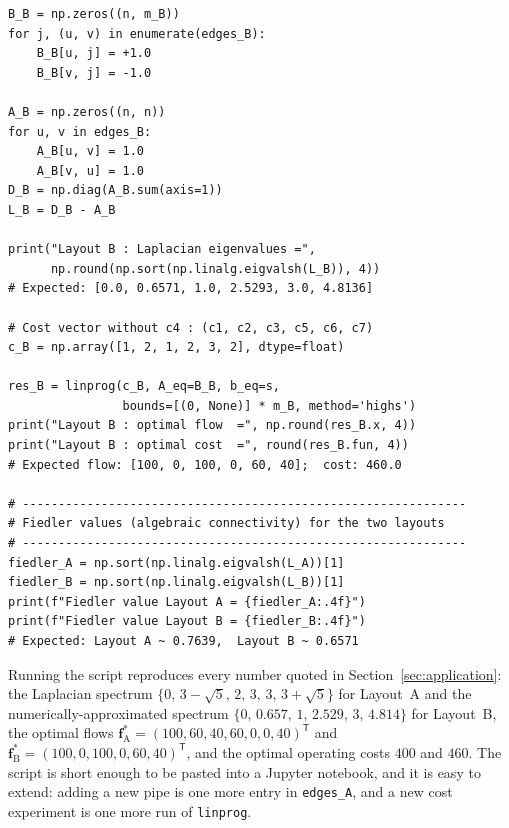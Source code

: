\documentclass[11pt,a4paper]{article}
\newcommand{\vect}[1]{\mathbf{#1}}
\newcommand{\transpose}{^{\mathsf{T}}}
\begin{document}
\begin{verbatim}
B_B = np.zeros((n, m_B))
for j, (u, v) in enumerate(edges_B):
    B_B[u, j] = +1.0
    B_B[v, j] = -1.0

A_B = np.zeros((n, n))
for u, v in edges_B:
    A_B[u, v] = 1.0
    A_B[v, u] = 1.0
D_B = np.diag(A_B.sum(axis=1))
L_B = D_B - A_B

print("Layout B : Laplacian eigenvalues =",
      np.round(np.sort(np.linalg.eigvalsh(L_B)), 4))
# Expected: [0.0, 0.6571, 1.0, 2.5293, 3.0, 4.8136]

# Cost vector without c4 : (c1, c2, c3, c5, c6, c7)
c_B = np.array([1, 2, 1, 2, 3, 2], dtype=float)

res_B = linprog(c_B, A_eq=B_B, b_eq=s,
                bounds=[(0, None)] * m_B, method='highs')
print("Layout B : optimal flow  =", np.round(res_B.x, 4))
print("Layout B : optimal cost  =", round(res_B.fun, 4))
# Expected flow: [100, 0, 100, 0, 60, 40];  cost: 460.0

# --------------------------------------------------------------
# Fiedler values (algebraic connectivity) for the two layouts
# --------------------------------------------------------------
fiedler_A = np.sort(np.linalg.eigvalsh(L_A))[1]
fiedler_B = np.sort(np.linalg.eigvalsh(L_B))[1]
print(f"Fiedler value Layout A = {fiedler_A:.4f}")
print(f"Fiedler value Layout B = {fiedler_B:.4f}")
# Expected: Layout A ~ 0.7639,  Layout B ~ 0.6571
\end{verbatim}

Running the script reproduces every number quoted in
Section~\ref{sec:application}: the Laplacian spectrum
$\{0,\, 3-\sqrt{5},\, 2,\, 3,\, 3,\, 3+\sqrt{5}\}$ for Layout~A and the
numerically-approximated spectrum $\{0,\, 0.657,\, 1,\, 2.529,\, 3,\,
4.814\}$ for Layout~B, the optimal flows
$\vect{f}^{*}_{\mathrm{A}} = (100, 60, 40, 60, 0, 0, 40)\transpose$ and
$\vect{f}^{*}_{\mathrm{B}} = (100, 0, 100, 0, 60, 40)\transpose$, and
the optimal operating costs $400$ and $460$. The script is short
enough to be pasted into a Jupyter notebook, and it is easy to extend:
adding a new pipe is one more entry in \texttt{edges\_A}, and a new
cost experiment is one more run of \texttt{linprog}.
\end{document}
